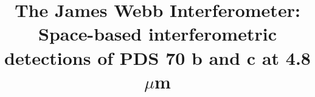 \documentclass[11pt,twocolumn,twocolappendix]{aastex631}
\begin{document}
\title{The James Webb Interferometer: Space-based interferometric detections of PDS 70 b and c at 4.8 $\mu$m}


\end{document}
